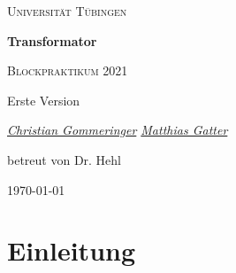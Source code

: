 \documentclass[a4paper, 12pt,]{scrartcl}
\begin{document}
\begin{titlepage}
	\centering
	{\scshape\LARGE Universität Tübingen \par}
	\vspace{2cm}
	{\huge\bfseries Transformator \par}
	\vspace{2cm}
	{\Large \scshape Blockpraktikum 2021} \par
	\vspace{2cm}
	{\Large  Erste Version} \par
	\vspace{2cm}
	{\Large\itshape \underline{Christian Gommeringer} \space \space  \underline{Matthias Gatter}\par}
	\vfill 
	{\large betreut von Dr. Hehl}
	\vfill

	{\large \today\par}
\end{titlepage}
\newpage 
\tableofcontents 

\newpage
\section{Einleitung}
\begin{flushleft}


\end{flushleft}
\end{document}
